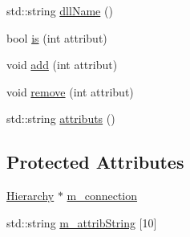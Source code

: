 \begin{DoxyCompactItemize}
\item 
std\+::string \hyperlink{classObject_a2e3947f2870094c332d7454117f3ec63}{dll\+Name} ()
\item 
bool \hyperlink{classAttrib_a704f26af560909ad22065083bb7d4c34}{is} (int attribut)
\item 
void \hyperlink{classAttrib_a235f773af19c900264a190b00a3b4ad7}{add} (int attribut)
\item 
void \hyperlink{classAttrib_a7d4ef7e32d93cb287792b87b857e79f3}{remove} (int attribut)
\item 
std\+::string \hyperlink{classAttrib_aee7bbf16b144887f196e1341b24f8a26}{attributs} ()
\end{DoxyCompactItemize}
\subsection*{Protected Attributes}
\begin{DoxyCompactItemize}
\item 
\hyperlink{classHierarchy}{Hierarchy} $\ast$ \hyperlink{classElement_abe3de7a5dbbc9a6dd2d7e012e5fdb266}{m\+\_\+connection}
\item 
std\+::string \hyperlink{classAttrib_a3414521d7a82476e874b25a5407b5e63}{m\+\_\+attrib\+String} \mbox{[}10\mbox{]}
\end{DoxyCompactItemize}

